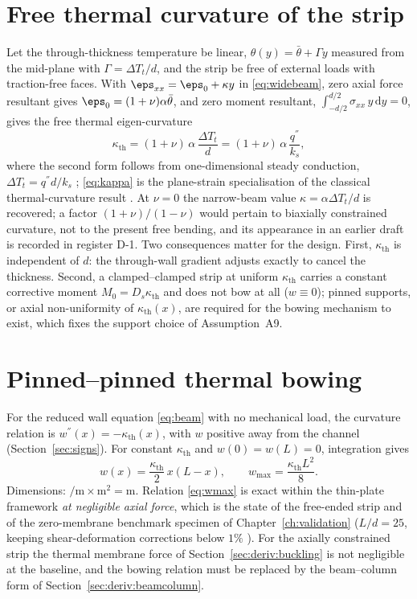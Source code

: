 \section{Free thermal curvature of the strip}
\label{sec:deriv:curvature}
Let the through-thickness temperature be linear,
$\theta(y)=\bar\theta+\Gamma y$ measured from the mid-plane with $\Gamma=\Delta T_t/d$, and the
strip be free of external loads with traction-free faces. With
$\eps_{xx}=\eps_0+\kappa y$ in \eqref{eq:widebeam}, zero axial force resultant gives
$\eps_0=(1+\nu)\alpha\bar\theta$, and zero moment resultant,
$\int_{-d/2}^{d/2}\sigma_{xx}\,y\,\mathrm dy=0$, gives the free thermal eigen-curvature
\begin{equation}
\kappa_{\mathrm{th}}=(1+\nu)\,\alpha\,\frac{\Delta T_t}{d}
=(1+\nu)\,\alpha\,\frac{q^{''}}{k_s},
\label{eq:kappa}
\end{equation}
where the second form follows from one-dimensional steady conduction, $\Delta T_t=q^{''}d/k_s$
\cite{carslaw1947conduction}; \eqref{eq:kappa} is the plane-strain specialisation of the classical
thermal-curvature result \cite{boley1960theory}. At $\nu=0$ the narrow-beam value
$\kappa=\alpha\Delta T_t/d$ is recovered; a factor $(1+\nu)/(1-\nu)$ would pertain to biaxially
constrained curvature, not to the present free bending, and its appearance in an earlier draft is
recorded in register D-1. Two consequences matter for the design. First,
$\kappa_{\mathrm{th}}$ is independent of $d$: the through-wall gradient adjusts exactly to cancel
the thickness. Second, a clamped--clamped strip at uniform $\kappa_{\mathrm{th}}$ carries a
constant corrective moment $M_0=D_s\kappa_{\mathrm{th}}$ and does not bow at all
($w\equiv0$); pinned supports, or axial non-uniformity of $\kappa_{\mathrm{th}}(x)$, are required
for the bowing mechanism to exist, which fixes the support choice of Assumption~A9.

\section{Pinned--pinned thermal bowing}
\label{sec:deriv:deflection}
For the reduced wall equation \eqref{eq:beam} with no mechanical load, the curvature relation is
$w^{''}(x)=-\kappa_{\mathrm{th}}(x)$, with $w$ positive away from the channel
(Section~\ref{sec:signs}). For constant $\kappa_{\mathrm{th}}$ and $w(0)=w(L)=0$,
integration gives
\begin{equation}
w(x)=\frac{\kappa_{\mathrm{th}}}{2}\,x(L-x),\qquad
w_{\max}=\frac{\kappa_{\mathrm{th}}L^2}{8} .
\label{eq:wmax}
\end{equation}
Dimensions: $\si{\per\metre}\times\si{\square\metre}=\si{\metre}$. Relation \eqref{eq:wmax} is
exact within the thin-plate framework \emph{at negligible axial force}, which is the state of the
free-ended strip and of the zero-membrane benchmark specimen of Chapter~\ref{ch:validation}
($L/d=25$, keeping shear-deformation corrections below $1\%$
\cite{timoshenko1961stability}). For the axially constrained strip the thermal membrane force of
Section~\ref{sec:deriv:buckling} is not negligible at the baseline, and the bowing relation must be
replaced by the beam--column form of Section~\ref{sec:deriv:beamcolumn}.%

